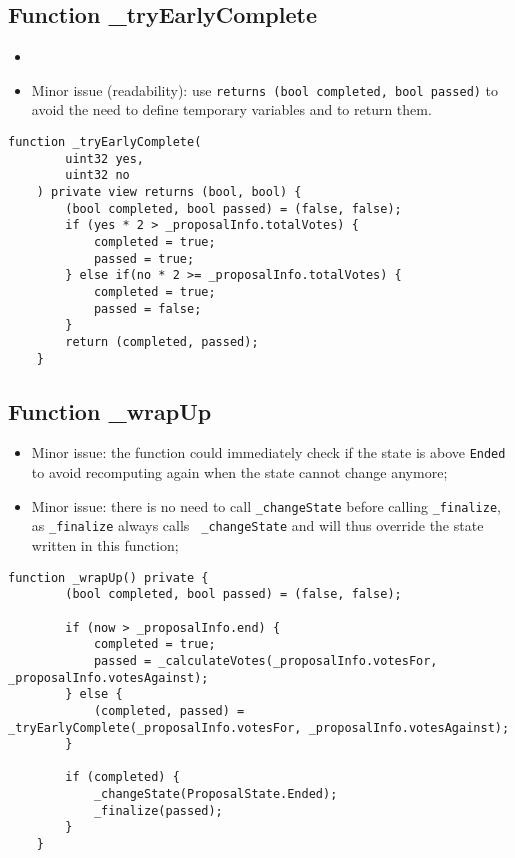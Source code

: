 \subsection{Function \_{}tryEarlyComplete}

\begin{itemize}
\item {}
\item Minor issue (readability): use {\tt returns (bool completed,
  bool passed)} to avoid the need to define temporary variables and to
  return them.
\end{itemize}

\begin{lstlisting}[firstnumber=101]
    function _tryEarlyComplete(
        uint32 yes,
        uint32 no
    ) private view returns (bool, bool) {
        (bool completed, bool passed) = (false, false);
        if (yes * 2 > _proposalInfo.totalVotes) {
            completed = true;
            passed = true;
        } else if(no * 2 >= _proposalInfo.totalVotes) {
            completed = true;
            passed = false;
        }
        return (completed, passed);
    }
\end{lstlisting}

\subsection{Function \_{}wrapUp}

\begin{itemize}
\item Minor issue: the function could immediately check if the state
  is above {\tt Ended} to avoid recomputing again when the state
  cannot change anymore;
\item Minor issue: there is no need to call {\tt \_changeState} before
  calling {\tt \_finalize}, as {\tt \_finalize} always calls {\tt
    \_changeState} and will thus override the state written in this
  function;
\end{itemize}

\begin{lstlisting}[firstnumber=116]
    function _wrapUp() private {
        (bool completed, bool passed) = (false, false);

        if (now > _proposalInfo.end) {
            completed = true;
            passed = _calculateVotes(_proposalInfo.votesFor, _proposalInfo.votesAgainst);
        } else {
            (completed, passed) = _tryEarlyComplete(_proposalInfo.votesFor, _proposalInfo.votesAgainst);
        }

        if (completed) {
            _changeState(ProposalState.Ended);
            _finalize(passed);
        }
    }
\end{lstlisting}
